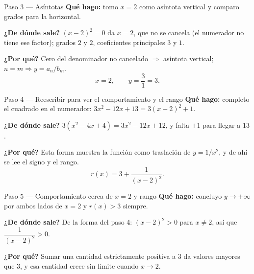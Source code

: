 \documentclass[11pt]{article}
\begin{document}
\begin{paso}{Paso 3 --- Asíntotas}
\textbf{Qué hago:} tomo $x=2$ como asíntota vertical y comparo grados para la horizontal.

\textbf{¿De dónde sale?} $(x-2)^2=0$ da $x=2$, que no se cancela (el numerador no tiene ese factor); grados $2$ y $2$, coeficientes principales $3$ y $1$.

\textbf{¿Por qué?} Cero del denominador no cancelado $\Rightarrow$ asíntota vertical; $n=m \Rightarrow y=a_n/b_m$.
\[
x=2,\qquad y=\frac{3}{1}=3 .
\]
\end{paso}

\begin{paso}{Paso 4 --- Reescribir para ver el comportamiento y el rango}
\textbf{Qué hago:} completo el cuadrado en el numerador: $3x^2-12x+13=3(x-2)^2+1$.

\textbf{¿De dónde sale?} $3(x^2-4x+4)=3x^2-12x+12$, y falta $+1$ para llegar a $13$.

\textbf{¿Por qué?} Esta forma muestra la función como traslación de $y=1/x^2$, y de ahí se lee el signo y el rango.
\[
r(x)=3+\frac{1}{(x-2)^2}.
\]
\end{paso}

\begin{paso}{Paso 5 --- Comportamiento cerca de $x=2$ y rango}
\textbf{Qué hago:} concluyo $y\to+\infty$ por ambos lados de $x=2$ y $r(x)>3$ siempre.

\textbf{¿De dónde sale?} De la forma del paso 4: $(x-2)^2>0$ para $x\ne 2$, así que $\dfrac{1}{(x-2)^2}>0$.

\textbf{¿Por qué?} Sumar una cantidad estrictamente positiva a $3$ da valores mayores que $3$, y esa cantidad crece sin límite cuando $x\to 2$.
\end{paso}

\begin{center}
\end{center}
\end{document}
